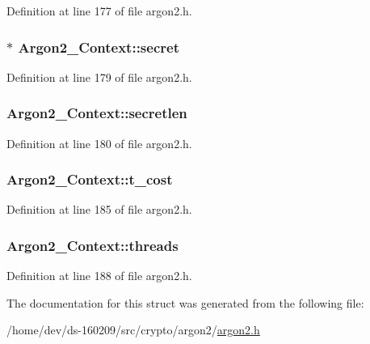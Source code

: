 Definition at line 177 of file argon2.\+h.

\hypertarget{struct_argon2___context_a7c35fd8bd296f776a9db6278c9bdacb6}{}
\subsubsection[{secret}]{$\ast$ Argon2\+\_\+\+Context\+::secret}\label{struct_argon2___context_a7c35fd8bd296f776a9db6278c9bdacb6}


Definition at line 179 of file argon2.\+h.

\hypertarget{struct_argon2___context_a9530abd766c77aba4e841445e5c70a08}{}
\subsubsection[{secretlen}]{ Argon2\+\_\+\+Context\+::secretlen}\label{struct_argon2___context_a9530abd766c77aba4e841445e5c70a08}


Definition at line 180 of file argon2.\+h.

\hypertarget{struct_argon2___context_adffe97f0527779835c511385dfc5d63d}{}
\subsubsection[{t\+\_\+cost}]{ Argon2\+\_\+\+Context\+::t\+\_\+cost}\label{struct_argon2___context_adffe97f0527779835c511385dfc5d63d}


Definition at line 185 of file argon2.\+h.

\hypertarget{struct_argon2___context_a1efec02e4fd164068c7e77ec5f8b5b01}{}
\subsubsection[{threads}]{ Argon2\+\_\+\+Context\+::threads}\label{struct_argon2___context_a1efec02e4fd164068c7e77ec5f8b5b01}


Definition at line 188 of file argon2.\+h.



The documentation for this struct was generated from the following file\+:\begin{DoxyCompactItemize}
\item 
/home/dev/ds-\/160209/src/crypto/argon2/\hyperlink{argon2_8h}{argon2.\+h}\end{DoxyCompactItemize}
